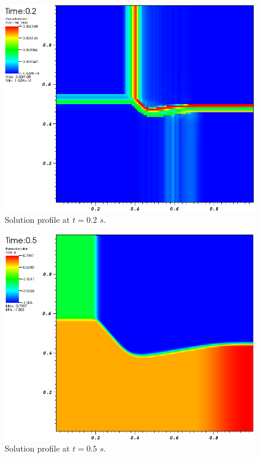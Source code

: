 %
\begin{figure}[H]
	\centering
	\includegraphics[width=\textwidth]{figures/Burger2D_visc_t0p2.png}
	\caption{Solution profile at $t=0.2$ $s$.}
	\label{fig:2d_burger_visc_t0p2}
\end{figure}
%
\begin{figure}[H]
	\centering
	\includegraphics[width=\textwidth]{figures/Burger2D_sol_t0p5.png}
	\caption{Solution profile at $t=0.5$ $s$.}
	\label{fig:2d_burger_sol_t0p5}
\end{figure}
%
